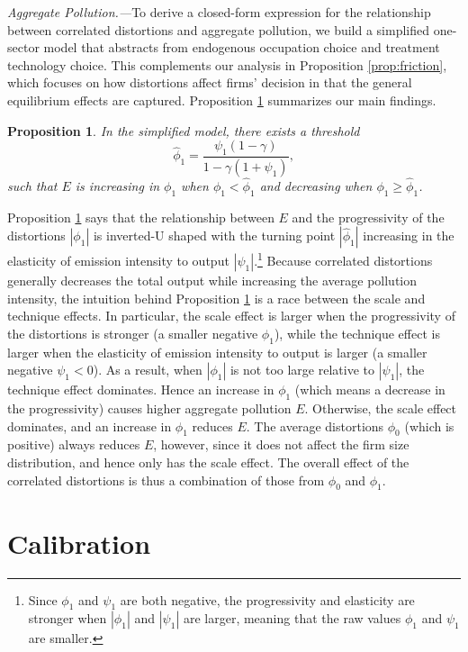\documentclass[AEJ]{AEA}
\newtheorem{proposition}{Proposition}
\begin{document}
\textit{Aggregate Pollution.---}To derive a closed-form expression for the relationship between correlated distortions and aggregate pollution, we build a simplified one-sector model that abstracts from endogenous occupation choice and treatment technology choice. This complements our analysis in Proposition \ref{prop:friction}, which focuses on how distortions affect firms' decision in that the general equilibrium effects are captured. Proposition \ref{prop:agge} summarizes our main findings.
\begin{proposition}
\label{prop:agge}
In the simplified model, there exists a threshold
\begin{equation*}
    \hat{\phi}_1 = \frac{\psi_1(1-\gamma)}{1-\gamma(1+\psi_1)},
\end{equation*}
such that $E$ is increasing in $\phi_1$ when $\phi_1 < \hat{\phi}_1$ and decreasing when $\phi_1 \geq \hat{\phi}_1$.
\end{proposition}

Proposition \ref{prop:agge} says that the relationship between $E$ and the progressivity of the distortions $|\phi_1|$ is inverted-U shaped with the turning point $|\hat{\phi}_1|$ increasing in the elasticity of emission intensity to output $|\psi_1|$.\footnote{Since $\phi_1$ and $\psi_1$ are both negative, the progressivity and elasticity are stronger when $|\phi_1|$ and $|\psi_1|$ are larger, meaning that the raw values $\phi_1$ and $\psi_1$ are smaller.} Because correlated distortions generally decreases the total output while increasing the average pollution intensity, the intuition behind Proposition \ref{prop:agge} is a race between the scale and technique effects. In particular, the scale effect is larger when the progressivity of the distortions is stronger (a smaller negative $\phi_1$), while the technique effect is larger when the elasticity of emission intensity to output is larger (a smaller negative $\psi_1<0$). As a result, when $|\phi_1|$ is not too large relative to $|\psi_1|$, the technique effect dominates. Hence an increase in $\phi_1$ (which means a decrease in the progressivity) causes higher aggregate pollution $E$. Otherwise, the scale effect dominates, and an increase in $\phi_1$ reduces $E$. The average distortions $\phi_0$ (which is positive) always reduces $E$, however, since it does not affect the firm size distribution, and hence only has the scale effect. The overall effect of the correlated distortions is thus a combination of those from $\phi_0$ and $\phi_1$.

\section{Calibration}
\label{sec:calibration}
\end{document}

